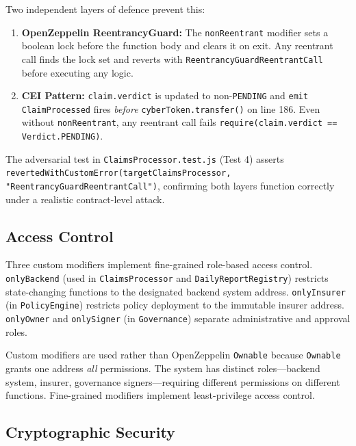 \documentclass[12pt,a4paper]{article}
\begin{document}
Two independent layers of defence prevent this:

\begin{enumerate}
  \item \textbf{OpenZeppelin ReentrancyGuard:} The \texttt{nonReentrant}
        modifier sets a boolean lock before the function body and clears it
        on exit. Any reentrant call finds the lock set and reverts with
        \texttt{ReentrancyGuardReentrantCall} before executing any logic.
  \item \textbf{CEI Pattern:} \texttt{claim.verdict} is updated to
        non-\texttt{PENDING} and \texttt{emit ClaimProcessed} fires
        \emph{before} \texttt{cyberToken.transfer()} on line 186.
        Even without \texttt{nonReentrant}, any reentrant call fails
        \texttt{require(claim.verdict == Verdict.PENDING)}.
\end{enumerate}

The adversarial test in \texttt{ClaimsProcessor.test.js} (Test 4) asserts
\texttt{revertedWithCustomError(targetClaimsProcessor,
"ReentrancyGuardReentrantCall")}, confirming both layers function correctly
under a realistic contract-level attack.

\subsection{Access Control}
\label{sec:access-control}

Three custom modifiers implement fine-grained role-based access control.
\texttt{onlyBackend} (used in \texttt{ClaimsProcessor} and
\texttt{DailyReportRegistry}) restricts state-changing functions to the
designated backend system address. \texttt{onlyInsurer} (in
\texttt{PolicyEngine}) restricts policy deployment to the immutable insurer
address. \texttt{onlyOwner} and \texttt{onlySigner} (in \texttt{Governance})
separate administrative and approval roles.

Custom modifiers are used rather than OpenZeppelin \texttt{Ownable} because
\texttt{Ownable} grants one address \emph{all} permissions. The system has
distinct roles---backend system, insurer, governance signers---requiring
different permissions on different functions. Fine-grained modifiers
implement least-privilege access control.

\subsection{Cryptographic Security}
\label{sec:crypto}
\end{document}
